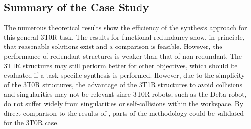 \subsection{Summary of the Case Study}
\label{sec:eval_handling_summary}

The numerous theoretical results show the efficiency of the synthesis approach for this general 3T0R task. %
The results for functional redundancy show, in principle, that reasonable solutions exist and a comparison is feasible. %
However, the performance of redundant structures is weaker than that of non-redundant. %
The 3T1R structures may still perform better for other objectives, which should be evaluated if a task-specific synthesis is performed.
However, due to the simplicity of the 3T0R structures, the advantage of the 3T1R structures to avoid collisions and singularities may not be relevant since 3T0R robots, such as the Delta robot, do not suffer widely from singularities or self-collisions within the workspace.
%
By direct comparison to the results of \cite{PrauseChaCor2015}, parts of the methodology could be validated for the 3T0R case.

